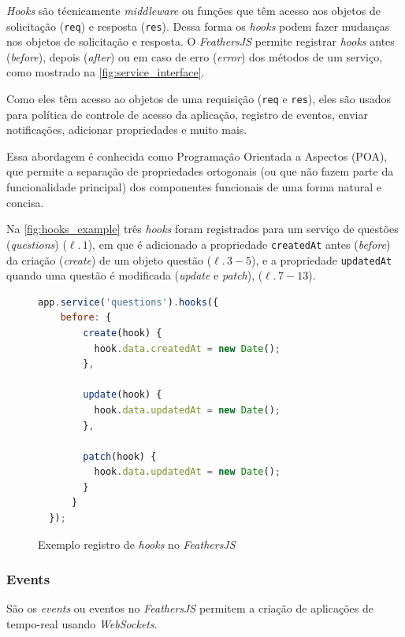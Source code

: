 \textit{Hooks} são técnicamente \textit{middleware} ou funções que têm acesso aos
objetos de solicitação (\texttt{req}) e resposta (\texttt{res}).
Dessa forma os \textit{hooks} podem fazer mudanças nos objetos de solicitação e resposta.
O \textit{\textit{FeathersJS}} permite registrar \textit{hooks} antes (\textit{before}), depois
(\textit{after}) ou em caso de erro (\textit{error}) dos métodos de
um serviço, como mostrado na \autoref{fig:service_interface}.

Como eles têm acesso ao objetos de uma requisição (\texttt{req} e \texttt{res}), eles são usados
para política de controle de acesso da aplicação, registro de eventos, enviar
notificações, adicionar propriedades e muito mais.

Essa abordagem é conhecida como Programação Orientada a Aspectos (POA), que permite
a separação de propriedades ortogonais (ou que não fazem parte da funcionalidade
principal) dos componentes funcionais de uma forma natural e concisa.

Na \autoref{fig:hooks_example} três \textit{hooks} foram registrados para um serviço de questões (\textit{questions}) ($\ell.\,1$),
em que é adicionado a propriedade \texttt{createdAt} antes (\textit{before}) da criação (\textit{create}) de um objeto questão ($\ell.\,3-5$),
e a propriedade \texttt{updatedAt} quando uma questão é modificada (\textit{update} e \textit{patch}), ($\ell.\,7-13$).

\begin{figure}[h]
\begin{lstlisting}[language=JavaScript]
  app.service('questions').hooks({
    before: {
        create(hook) {
          hook.data.createdAt = new Date();
        },

        update(hook) {
          hook.data.updatedAt = new Date();
        },

        patch(hook) {
          hook.data.updatedAt = new Date();
        }
      }
  });
\end{lstlisting}
\caption{Exemplo registro de \textit{hooks} no \textit{\textit{FeathersJS}}}
\label{fig:hooks_example}
\end{figure}

\subsubsection{Events}

São os \textit{events} ou eventos no \textit{\textit{FeathersJS}} permitem
a criação de aplicações de tempo-real usando \textit{WebSockets}.

